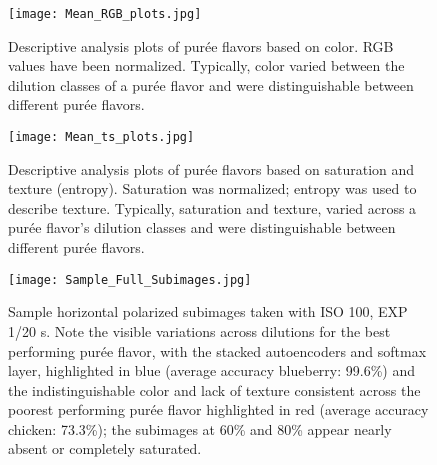 \documentclass[authoryear]{elsarticle}
\begin{document}
\begin{figure}
\centering
\texttt{[image: Mean\_RGB\_plots.jpg]}
\caption{Descriptive analysis plots of pur\' ee flavors based on color. RGB values  have been normalized. Typically, color varied between the dilution classes of a pur\' ee flavor and were distinguishable between different pur\' ee flavors.}
\label{fig:RGB_norm}
\end{figure}\begin{figure}
\centering
\texttt{[image: Mean\_ts\_plots.jpg]}
\caption{Descriptive analysis plots of pur\' ee flavors based on saturation and texture (entropy). Saturation was  normalized; entropy was used to describe texture. Typically, saturation and texture, varied across a pur\' ee flavor's dilution classes and were distinguishable between different pur\' ee flavors.}
\label{fig:sat_entropy}
\end{figure}\begin{figure}
\centering
\texttt{[image: Sample\_Full\_Subimages.jpg]}
\caption{Sample horizontal polarized subimages taken with ISO 100, EXP 1/20 s. Note the visible variations across dilutions for the best performing pur\' ee flavor, with the stacked autoencoders and softmax layer, highlighted in blue (average accuracy blueberry: 99.6\%) and the indistinguishable color and lack of texture consistent across the poorest performing pur\' ee flavor highlighted in red (average accuracy chicken: 73.3\%); the subimages at 60\% and 80\% appear nearly absent or completely saturated.}
\label{fig:sample_blobs}
\end{figure}%
  \centering
  \caption{Summary of sensitivity, specificity and accuracy for each flavor using self-generated features extracted from an autoencoder and four methods for to discriminate between dilutions: softmax layer, random forest, SVM - linear kernel SVM, and SVM - radial basis kernel. Results summarized represent five randomly initiated networks with 6-fold cross-validation (i.e., leave one of each of the six imaged positions out for testing) for each flavor.}
\end{document}
